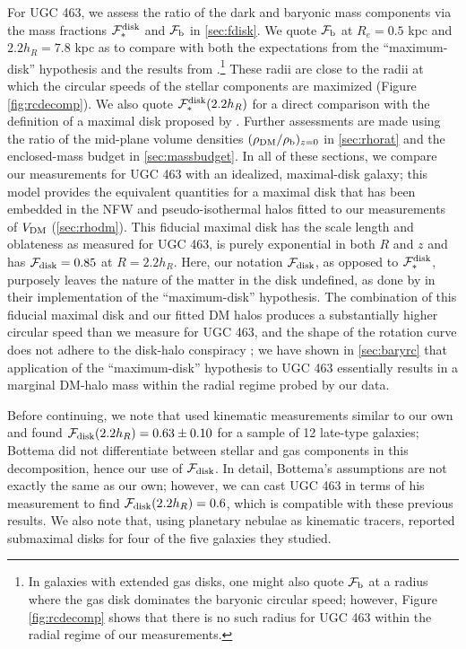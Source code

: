 \documentclass[apj,iop,numberedappendix]{emulateapj}
\begin{document}
For UGC 463, we assess the ratio of the dark and baryonic mass components via
the mass fractions $\mathcal{F}_{\ast}^{\rm disk}$ and $\mathcal{F}_{\rm b}$ in \sect \ref{sec:fdisk}.  We quote
$\mathcal{F}_{\rm b}$ at $R_e = 0.5$ kpc and $2.2h_R = 7.8$ kpc as to compare with both the
expectations from the ``maximum-disk'' hypothesis and the results from
\citet{2011arXiv1101.1622D}.\footnote{
%
In galaxies with extended gas disks, one might also quote $\mathcal{F}_{\rm b}$ at a radius
where the gas disk dominates the baryonic circular speed; however, Figure
\ref{fig:rcdecomp} shows that there is no such radius for UGC 463 within the
radial regime of our measurements.
%
} These radii are close to the radii at which the circular speeds of the stellar
components are maximized (Figure \ref{fig:rcdecomp}).  We also quote
$\mathcal{F}_{\ast}^{\rm disk}(2.2h_R)$ for a direct comparison with the definition of a maximal disk
proposed by \citet{1997ApJ...483..103S}.  Further assessments are made using the
ratio of the mid-plane volume densities $(\rho_{\rm DM}/\rho_{\rm b})_{z=0}$ in \sect
\ref{sec:rhorat} and the enclosed-mass budget in \sect \ref{sec:massbudget}.  In
all of these sections, we compare our measurements for UGC 463 with an
idealized, maximal-disk galaxy; this model provides the equivalent quantities
for a maximal disk that has been embedded in the NFW and pseudo-isothermal halos
fitted to our measurements of $V_{\rm DM}$ (\sect \ref{sec:rhodm}).  This fiducial
maximal disk has the scale length and oblateness as measured for UGC 463, is
purely exponential in both $R$ and $z$ and has $\mathcal{F}_{\rm disk} = 0.85$ at $R=2.2 h_R$.
Here, our notation $\mathcal{F}_{\rm disk}$, as opposed to $\mathcal{F}_{\ast}^{\rm disk}$, purposely leaves the nature of
the matter in the disk undefined, as done by  in
their implementation of the ``maximum-disk'' hypothesis.  The combination of
this fiducial maximal disk and our fitted DM halos produces a substantially
higher circular speed than we measure for UGC 463, and the shape of the rotation
curve does not adhere to the disk-halo conspiracy
; we have shown in \sect \ref{sec:baryrc} that
application of the ``maximum-disk'' hypothesis to UGC 463 essentially results in
a marginal DM-halo mass within the radial regime probed by our data.

Before continuing, we note that \citet{1993A&A...275...16B, 1997A&A...328..517B}
used kinematic measurements similar to our own and found $\mathcal{F}_{\rm disk}(2.2h_R) =
0.63\pm0.10$ for a sample of 12 late-type galaxies; Bottema did not
differentiate between stellar and gas components in this decomposition, hence
our use of $\mathcal{F}_{\rm disk}$.  In detail, Bottema's assumptions are not exactly the same as
our own; however, we can cast UGC 463 in terms of his measurement to find
$\mathcal{F}_{\rm disk}(2.2 h_R) = 0.6$, which is compatible with these previous results.  We also
note that, using planetary nebulae as kinematic tracers,
\citet{2009ApJ...705.1686H} reported submaximal disks for four of the five
galaxies they studied.
\end{document}
